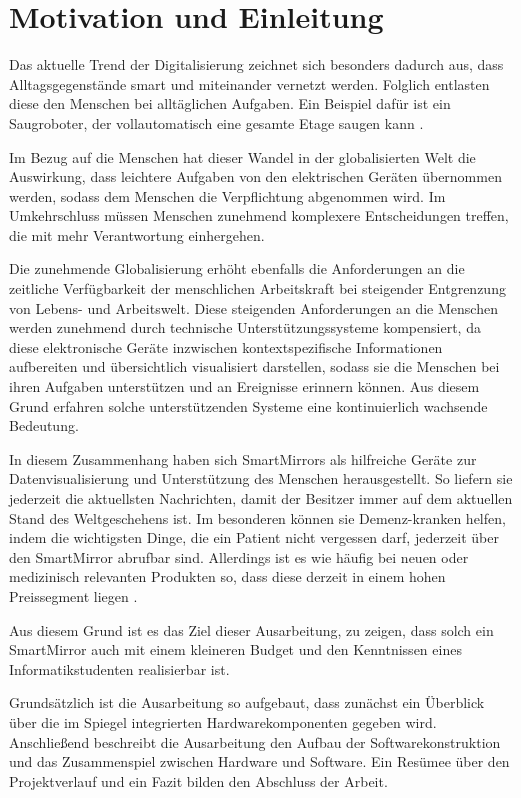 \section{Motivation und Einleitung}
Das aktuelle Trend der Digitalisierung zeichnet sich besonders dadurch aus, dass Alltagsgegenstände smart und miteinander vernetzt werden. Folglich entlasten diese den Menschen bei alltäglichen Aufgaben. Ein Beispiel dafür ist ein Saugroboter, der vollautomatisch eine gesamte Etage saugen kann \cite{irobot2017}.\cite{kagermann2017mobilitatswende}

Im Bezug auf die Menschen hat dieser Wandel in der globalisierten Welt die Auswirkung, dass leichtere Aufgaben von den elektrischen Geräten übernommen werden, sodass dem Menschen die Verpflichtung abgenommen wird. Im Umkehrschluss müssen Menschen zunehmend komplexere Entscheidungen treffen, die mit mehr Verantwortung einhergehen. \cite{Norbisrath:62365}

Die zunehmende Globalisierung erhöht ebenfalls die Anforderungen an die zeitliche Verfügbarkeit der menschlichen Arbeitskraft bei steigender Entgrenzung von Lebens- und Arbeitswelt. Diese steigenden Anforderungen an die Menschen werden zunehmend durch technische Unterstützungssysteme kompensiert, da diese elektronische Geräte inzwischen kontextspezifische Informationen aufbereiten und übersichtlich visualisiert darstellen, sodass sie die Menschen bei ihren Aufgaben unterstützen und an Ereignisse erinnern können. Aus diesem Grund erfahren solche unterstützenden Systeme eine kontinuierlich wachsende Bedeutung.

In diesem Zusammenhang haben sich SmartMirrors als hilfreiche Geräte zur Datenvisualisierung und Unterstützung des Menschen herausgestellt. So liefern sie jederzeit die aktuellsten Nachrichten, damit der Besitzer immer auf dem aktuellen Stand des Weltgeschehens ist. Im besonderen können sie Demenz-kranken helfen, indem die wichtigsten Dinge, die ein Patient nicht vergessen darf, jederzeit über den SmartMirror abrufbar sind. Allerdings ist es wie häufig bei neuen oder medizinisch relevanten Produkten so, dass diese derzeit in einem hohen Preissegment liegen \cite{marketresearch16smartmirror}.

Aus diesem Grund ist es das Ziel dieser Ausarbeitung, zu zeigen, dass solch ein SmartMirror auch mit einem kleineren Budget und den Kenntnissen eines Informatikstudenten realisierbar ist.

Grundsätzlich ist die Ausarbeitung so aufgebaut, dass zunächst ein Überblick über die im Spiegel integrierten Hardwarekomponenten gegeben wird. Anschließend beschreibt die Ausarbeitung den Aufbau der Softwarekonstruktion und das Zusammenspiel zwischen Hardware und Software. Ein Resümee über den Projektverlauf und ein Fazit bilden den Abschluss der Arbeit.




